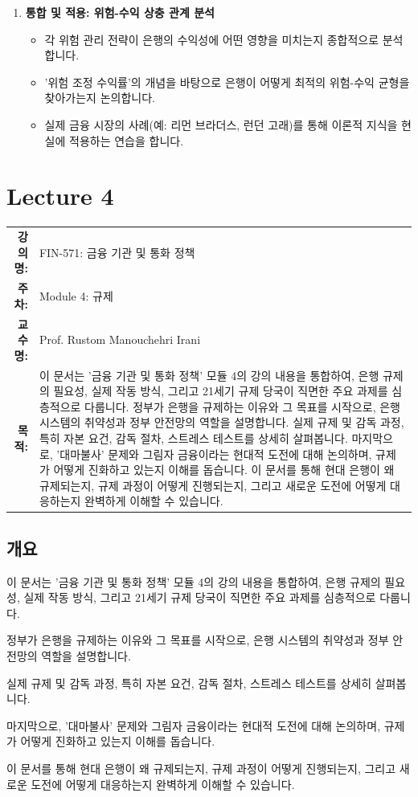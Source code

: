 \documentclass[11pt,a4paper]{book}
\makeatletter
\theoremstyle{definition}
\newcommand{\metainfo}[4]{
\begin{tcolorbox}[
    colback=lightpurple,
    colframe=darkpurple,
    boxrule=1pt,
    arc=2mm,
    left=10pt,
    right=10pt,
    top=8pt,
    bottom=8pt
]
\begin{tabular}{@{}rl@{}}
\textbf{강의명:} & #1 \\[0.3em]
\textbf{주차:} & #2 \\[0.3em]
\textbf{교수명:} & #3 \\[0.3em]
\textbf{목적:} & \begin{minipage}[t]{0.75\textwidth}#4\end{minipage}
\end{tabular}
\end{tcolorbox}
}
\makeatother
\begin{document}
\begin{infobox}[title=\textbf{모듈 3 학습 로드맵}]
\begin{enumerate}
    \item \textbf{통합 및 적용: 위험-수익 상충 관계 분석}
    \begin{itemize}
        \item 각 위험 관리 전략이 은행의 수익성에 어떤 영향을 미치는지 종합적으로 분석합니다.
        \item '위험 조정 수익률'의 개념을 바탕으로 은행이 어떻게 최적의 위험-수익 균형을 찾아가는지 논의합니다.
        \item 실제 금융 시장의 사례(예: 리먼 브라더스, 런던 고래)를 통해 이론적 지식을 현실에 적용하는 연습을 합니다.
    \end{itemize}
\end{enumerate}
\end{infobox}


\chapter{Lecture 4}
\label{ch:module4}

\metainfo{FIN-571: 금융 기관 및 통화 정책}{Module 4: 규제}{Prof. Rustom Manouchehri Irani}{이 문서는 '금융 기관 및 통화 정책' 모듈 4의 강의 내용을 통합하여, 은행 규제의 필요성, 실제 작동 방식, 그리고 21세기 규제 당국이 직면한 주요 과제를 심층적으로 다룹니다. 정부가 은행을 규제하는 이유와 그 목표를 시작으로, 은행 시스템의 취약성과 정부 안전망의 역할을 설명합니다. 실제 규제 및 감독 과정, 특히 자본 요건, 감독 절차, 스트레스 테스트를 상세히 살펴봅니다. 마지막으로, '대마불사' 문제와 그림자 금융이라는 현대적 도전에 대해 논의하며, 규제가 어떻게 진화하고 있는지 이해를 돕습니다. 이 문서를 통해 현대 은행이 왜 규제되는지, 규제 과정이 어떻게 진행되는지, 그리고 새로운 도전에 어떻게 대응하는지 완벽하게 이해할 수 있습니다.}


\section{개요}

\begin{summarybox}[title=모듈 4: 규제 개요]
이 문서는 '금융 기관 및 통화 정책' 모듈 4의 강의 내용을 통합하여, 은행 규제의 필요성, 실제 작동 방식, 그리고 21세기 규제 당국이 직면한 주요 과제를 심층적으로 다룹니다.

정부가 은행을 규제하는 이유와 그 목표를 시작으로, 은행 시스템의 취약성과 정부 안전망의 역할을 설명합니다.

실제 규제 및 감독 과정, 특히 자본 요건, 감독 절차, 스트레스 테스트를 상세히 살펴봅니다.

마지막으로, '대마불사' 문제와 그림자 금융이라는 현대적 도전에 대해 논의하며, 규제가 어떻게 진화하고 있는지 이해를 돕습니다.

이 문서를 통해 현대 은행이 왜 규제되는지, 규제 과정이 어떻게 진행되는지, 그리고 새로운 도전에 어떻게 대응하는지 완벽하게 이해할 수 있습니다.
\end{summarybox}
\end{document}
